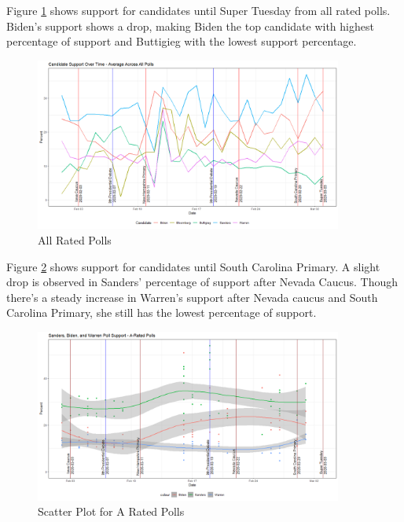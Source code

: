 Figure \ref{All-rated-polls} shows support for candidates until Super Tuesday from all rated polls. Biden's support shows a drop, making Biden the top candidate with highest percentage of support and Buttigieg with the lowest support percentage. 
\begin{figure}[H]
    \centering
    \includegraphics[width=0.9\textwidth]{figures/All-rated-polls.png}
    \caption{All Rated Polls}
    \label{All-rated-polls}
\end{figure}

Figure \ref{scatter-A-rated} shows support for candidates until South Carolina Primary. A slight drop is observed in Sanders' percentage of support after Nevada Caucus. Though there's a steady increase in Warren's support after Nevada caucus and South Carolina Primary, she still has the lowest percentage of support. 
\begin{figure}[H]
    \centering
    \includegraphics[width=0.9\textwidth]{figures/scatter-A-rated.png}
    \caption{Scatter Plot for A Rated Polls}
    \label{scatter-A-rated}
\end{figure}

